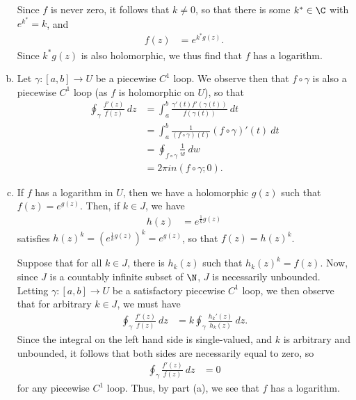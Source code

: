 \documentclass[10pt]{mypackage}
\begin{document}
\begin{solution}
\begin{enumerate}[(a)]
      Since $f$ is never zero, it follows that $k\neq 0$, so that there is some $k^{\ast}\in \C$ with $e^{k^{\ast}} = k$, and
      \begin{align*}
        f(z) &= e^{k^{\ast}g(z)}.
      \end{align*}
      Since $k^{\ast}g(z)$ is also holomorphic, we thus find that $f$ has a logarithm.
    \item Let $\gamma\colon [a,b]\rightarrow U$ be a piecewise $C^{1}$ loop. We observe then that $f\circ \gamma$ is also a piecewise $C^{1}$ loop (as $f$ is holomorphic on $U$), so that
      \begin{align*}
        \oint_{\gamma}^{} \frac{f'(z)}{f(z)}\:dz &= \int_{a}^{b} \frac{\gamma'(t)f'\left( \gamma(t) \right)}{f\left(\gamma(t)\right)}\:dt\\
                                                 &= \int_{a}^{b} \frac{1}{\left( f\circ\gamma \right)(t)}\left( f\circ\gamma \right)'(t)\:dt\\
                                                 &= \oint_{f\circ\gamma}^{} \frac{1}{w}\:dw\\
                                                 &= 2\pi i n\left( f\circ\gamma;0 \right).
      \end{align*}
    \item If $f$ has a logarithm in $U$, then we have a holomorphic $g(z)$ such that $f(z) = e^{g(z)}$. Then, if $k\in J$, we have
      \begin{align*}
        h(z) &= e^{\frac{1}{k}g(z)}
      \end{align*}
      satisfies $h(z)^{k} = \left( e^{\frac{1}{k}g(z)} \right)^{k} = e^{g(z)}$, so that $f(z) = h(z)^{k}$.\newline

      Suppose that for all $k\in J$, there is $h_k(z)$ such that $h_k(z)^{k} = f(z)$. Now, since $J$ is a countably infinite subset of $\N$, $J$ is necessarily unbounded. Letting $\gamma\colon [a,b]\rightarrow U$ be a satisfactory piecewise $C^{1}$ loop, we then observe that for arbitrary $k\in J$, we must have
      \begin{align*}
        \oint_{\gamma}^{} \frac{f'(z)}{f(z)}\:dz &= k \oint_{\gamma}^{} \frac{h_k'(z)}{h_k(z)}\:dz.
      \end{align*}
      Since the integral on the left hand side is single-valued, and $k$ is arbitrary and unbounded, it follows that both sides are necessarily equal to zero, so
      \begin{align*}
        \oint_{\gamma}^{} \frac{f'(z)}{f(z)}\:dz &= 0
      \end{align*}
      for any piecewise $C^{1}$ loop. Thus, by part (a), we see that $f$ has a logarithm.
  \end{enumerate}
\end{solution}
\end{document}
